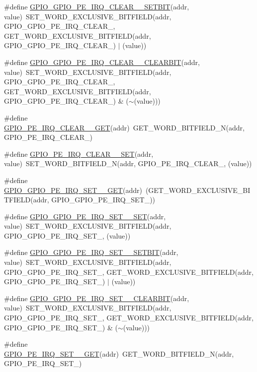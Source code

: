 \begin{DoxyCompactItemize}
\item 
\#define \hyperlink{a00554_a07e544e3383b5105fc3d1bbdf42d1121}{GPIO\_\-GPIO\_\-PE\_\-IRQ\_\-CLEAR\_\_\-SETBIT}(addr, value)~SET\_\-WORD\_\-EXCLUSIVE\_\-BITFIELD(addr, GPIO\_\-GPIO\_\-PE\_\-IRQ\_\-CLEAR\_, GET\_\-WORD\_\-EXCLUSIVE\_\-BITFIELD(addr, GPIO\_\-GPIO\_\-PE\_\-IRQ\_\-CLEAR\_) $|$ (value))
\item 
\#define \hyperlink{a00554_a61d914a92f02e162207ed91c7445f66f}{GPIO\_\-GPIO\_\-PE\_\-IRQ\_\-CLEAR\_\_\-CLEARBIT}(addr, value)~SET\_\-WORD\_\-EXCLUSIVE\_\-BITFIELD(addr, GPIO\_\-GPIO\_\-PE\_\-IRQ\_\-CLEAR\_, GET\_\-WORD\_\-EXCLUSIVE\_\-BITFIELD(addr, GPIO\_\-GPIO\_\-PE\_\-IRQ\_\-CLEAR\_) \& ($\sim$(value)))
\item 
\#define \hyperlink{a00554_a494fac3d7522782aeafba86c4169fc55}{GPIO\_\-PE\_\-IRQ\_\-CLEAR\_\_\-GET}(addr)~GET\_\-WORD\_\-BITFIELD\_\-N(addr, GPIO\_\-PE\_\-IRQ\_\-CLEAR\_)
\item 
\#define \hyperlink{a00554_a74ffeba642d107e778e303e3de0c784a}{GPIO\_\-PE\_\-IRQ\_\-CLEAR\_\_\-SET}(addr, value)~SET\_\-WORD\_\-BITFIELD\_\-N(addr, GPIO\_\-PE\_\-IRQ\_\-CLEAR\_, (value))
\item 
\#define \hyperlink{a00554_aeae9a88edd44ceab76c4890a3e710844}{GPIO\_\-GPIO\_\-PE\_\-IRQ\_\-SET\_\_\-GET}(addr)~(GET\_\-WORD\_\-EXCLUSIVE\_\-BITFIELD(addr, GPIO\_\-GPIO\_\-PE\_\-IRQ\_\-SET\_))
\item 
\#define \hyperlink{a00554_a8d53e671183a6c3af4e8424a21801fa9}{GPIO\_\-GPIO\_\-PE\_\-IRQ\_\-SET\_\_\-SET}(addr, value)~SET\_\-WORD\_\-EXCLUSIVE\_\-BITFIELD(addr, GPIO\_\-GPIO\_\-PE\_\-IRQ\_\-SET\_, (value))
\item 
\#define \hyperlink{a00554_ae22f0c931be03f92dd747eec8a1a121d}{GPIO\_\-GPIO\_\-PE\_\-IRQ\_\-SET\_\_\-SETBIT}(addr, value)~SET\_\-WORD\_\-EXCLUSIVE\_\-BITFIELD(addr, GPIO\_\-GPIO\_\-PE\_\-IRQ\_\-SET\_, GET\_\-WORD\_\-EXCLUSIVE\_\-BITFIELD(addr, GPIO\_\-GPIO\_\-PE\_\-IRQ\_\-SET\_) $|$ (value))
\item 
\#define \hyperlink{a00554_a6d4a21e2ed39af21a5308aa37fc52a8e}{GPIO\_\-GPIO\_\-PE\_\-IRQ\_\-SET\_\_\-CLEARBIT}(addr, value)~SET\_\-WORD\_\-EXCLUSIVE\_\-BITFIELD(addr, GPIO\_\-GPIO\_\-PE\_\-IRQ\_\-SET\_, GET\_\-WORD\_\-EXCLUSIVE\_\-BITFIELD(addr, GPIO\_\-GPIO\_\-PE\_\-IRQ\_\-SET\_) \& ($\sim$(value)))
\item 
\#define \hyperlink{a00554_a23a1a3b13f48974f994501cb66c4e2ad}{GPIO\_\-PE\_\-IRQ\_\-SET\_\_\-GET}(addr)~GET\_\-WORD\_\-BITFIELD\_\-N(addr, GPIO\_\-PE\_\-IRQ\_\-SET\_)

\end{DoxyCompactItemize}
